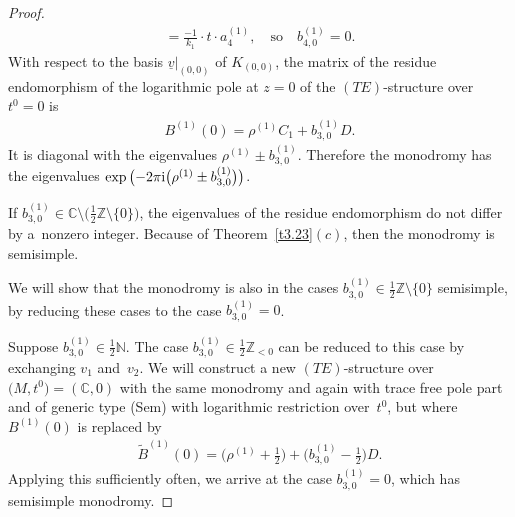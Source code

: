 \documentclass[pdftex]{sigma}%
\numberwithin{equation}{section}
\numberwithin{figure}{section}
\newcommand{\N}{{\mathbb N}}
\newcommand{\Z}{{\mathbb Z}}
\newcommand{\C}{{\mathbb C}}
\newcommand{\www}{\widetilde}
\newcommand{\uuuu}{\underline}
\begin{document}
\begin{proof}
\begin{align*}
= \frac{-1}{k_1} \cdot t \cdot a_4^{(1)},\quad
\text{so}\quad b_{4,0}^{(1)}=0.
\end{align*}
With respect to the basis $\uuuu{v}|_{(0,0)}$ of $K_{(0,0)}$,
the matrix of the residue endomorphism of the logarithmic
pole at $z=0$ of the $(TE)$-structure over $t^0=0$ is
\begin{gather*}
B^{(1)}(0)= \rho^{(1)}C_1+b_{3,0}^{(1)}D.
\end{gather*}
It is diagonal with the eigenvalues $\rho^{(1)}\pm b_{3,0}^{(1)}$.
Therefore the monodromy has the eigenvalues
$\exp\big({-}2\pi {\rm i}\big(\rho^{(1)}\pm b_{3,0}^{(1)}\big)\big)$.

If $b_{3,0}^{(1)}\in\C\setminus \big(\frac{1}{2}\Z\setminus\{0\}\big)$, the eigenvalues
of the residue endomorphism do not differ by a~nonzero integer.
Because of Theorem~\ref{t3.23}$(c)$, then the monodromy is
semisimple.

We will show that the monodromy is also in the cases
$b_{3,0}^{(1)}\in\frac{1}{2}\Z\setminus\{0\}$ semisimple,
by reducing these cases to the case $b_{3,0}^{(1)}=0$.

Suppose $b_{3,0}^{(1)}\in\frac{1}{2}\N$. The case
$b_{3,0}^{(1)}\in \frac{1}{2}\Z_{<0}$ can be reduced to this
case by exchanging $v_1$ and~$v_2$.
We will construct a new $(TE)$-structure over $\big(M,t^0\big)=(\C,0)$
with the same monodromy and again with trace free pole part and
of generic type (Sem)
with logarithmic restriction over~$t^0$, but where
$B^{(1)}(0)$ is replaced by
\begin{gather*}%
\www B^{(1)}(0)=\bigg(\rho^{(1)}+\frac{1}{2}\bigg)+
\bigg(b_{3,0}^{(1)}-\frac{1}{2}\bigg)D.
\end{gather*}
Applying this sufficiently often, we arrive at the case
$b_{3,0}^{(1)}=0$, which has semisimple monodromy.


\end{proof}
\end{document}
